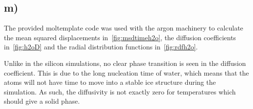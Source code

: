 \documentclass[11pt,british,a4paper]{report}
\begin{document}
\subsection*{m)}
The provided moltemplate code was used with the argon machinery to calculate the mean squared displacements in~\vref{fig:msdtimeh2o}, the diffusion coefficients in~\vref{fig:h2oD} and the radial distribution functions in~\vref{fig:rdfh2o}.

Unlike in the silicon simulations, no clear phase transition is seen in the diffusion coefficient.
This is due to the long nucleation time of water\cite{matsumoto_molecular_2002,angelil_homogeneous_2015}, which means that the atoms will not have time to move into a stable ice structure during the simulation.
As such, the diffusivity is not exactly zero for temperatures which should give a solid phase.
\end{document}
